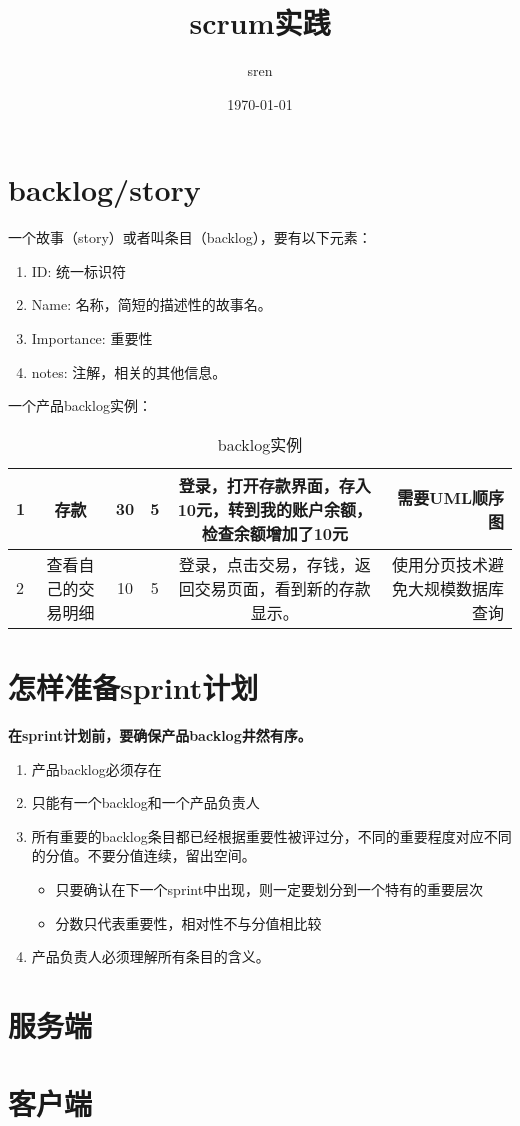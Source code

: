 \documentclass[a4paper,12pt]{article}
\title{scrum实践}
\author{sren}
\date{\today}
\begin{document}
\maketitle

\tableofcontents

 \section{backlog/story}

 一个故事（story）或者叫条目（backlog），要有以下元素：
 
 \begin{enumerate}
  \item ID: 统一标识符
  \item Name: 名称，简短的描述性的故事名。
  \item Importance: 重要性
  \item notes: 注解，相关的其他信息。
 \end{enumerate}

一个产品backlog实例：
\begin{table}
\begin{tabular}{|l|c|c|c|c|r|}
\hline
1	&存款	&30	&5	&登录，打开存款界面，存入10元，转到我的账户余额，检查余额增加了10元	&需要UML顺序图	\\
\hline
2	&查看自己的交易明细 &10 &5 &登录，点击交易，存钱，返回交易页面，看到新的存款显示。 &使用分页技术避免大规模数据库查询 \\
\hline
\end{tabular}
\caption{backlog实例}
\label{图表1}
\end{table}


\section{怎样准备sprint计划}
\textbf{在sprint计划前，要确保产品backlog井然有序。}

\begin{enumerate}
  \item 产品backlog必须存在
  \item 只能有一个backlog和一个产品负责人
  \item 所有重要的backlog条目都已经根据重要性被评过分，不同的重要程度对应不同的分值。不要分值连续，留出空间。
    \begin{itemize}
     \item 只要确认在下一个sprint中出现，则一定要划分到一个特有的重要层次
     \item 分数只代表重要性，相对性不与分值相比较
    \end{itemize}
  \item 产品负责人必须理解所有条目的含义。
 \end{enumerate}

\section{服务端}
 
\section{客户端}
\end{document}
